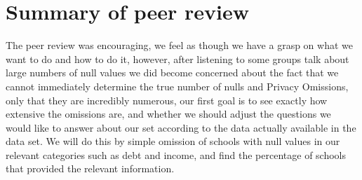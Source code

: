 \documentclass[11pt]{article}
\begin{document}
\section*{Summary of peer review}
\label{sec-6}
The peer review was encouraging, we feel as though we have a grasp on what we want to do and how to do it, however, after listening to some groups talk about large numbers of null values we did become concerned about the fact that we cannot immediately determine the true number of nulls and Privacy Omissions, only that they are incredibly numerous, our first goal is to see exactly how extensive the omissions are, and whether we should adjust the questions we would like to answer about our set according to the data actually available in the data set. We will do this by simple omission of schools with null values in our relevant categories such as debt and income, and find the percentage of schools that provided the relevant information.
\end{document}
